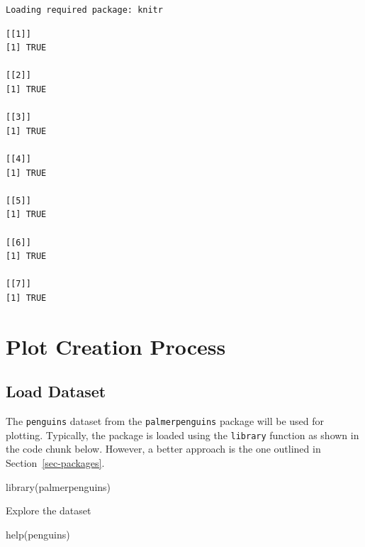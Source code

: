 \documentclass[
  letterpaper,
  DIV=11,
  numbers=noendperiod]{scrreprt}
\newenvironment{Shaded}{\begin{snugshade}}{\end{snugshade}}
\newcommand{\FunctionTok}[1]{\textcolor[rgb]{0.28,0.35,0.67}{#1}}
\newcommand{\NormalTok}[1]{\textcolor[rgb]{0.00,0.23,0.31}{#1}}
\begin{document}
\begin{verbatim}
Loading required package: knitr
\end{verbatim}

\begin{verbatim}
[[1]]
[1] TRUE

[[2]]
[1] TRUE

[[3]]
[1] TRUE

[[4]]
[1] TRUE

[[5]]
[1] TRUE

[[6]]
[1] TRUE

[[7]]
[1] TRUE
\end{verbatim}

\section{Plot Creation Process}\label{plot-creation-process}

\subsection{Load Dataset}\label{load-dataset}

The \texttt{penguins} dataset from the \texttt{palmerpenguins} package
will be used for plotting. Typically, the package is loaded using the
\texttt{library} function as shown in the code chunk below. However, a
better approach is the one outlined in Section~\ref{sec-packages}.

\begin{Shaded}
\begin{Highlighting}[]
\FunctionTok{library}\NormalTok{(palmerpenguins)}
\end{Highlighting}
\end{Shaded}

Explore the dataset

\begin{Shaded}
\begin{Highlighting}[]
\FunctionTok{help}\NormalTok{(penguins)}
\end{Highlighting}
\end{Shaded}
\end{document}
